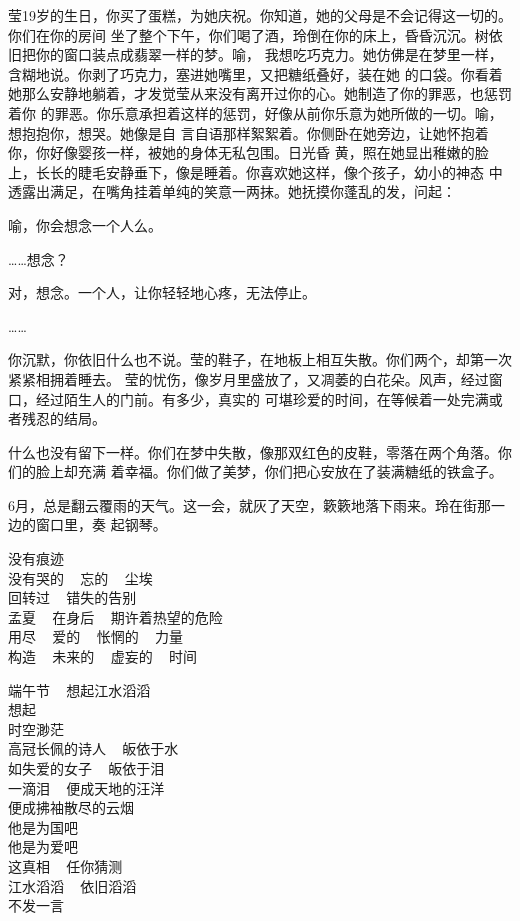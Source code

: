 		莹19岁的生日，你买了蛋糕，为她庆祝。你知道，她的父母是不会记得这一切的。你们在你的房间
	坐了整个下午，你们喝了酒，玲倒在你的床上，昏昏沉沉。树依旧把你的窗口装点成翡翠一样的梦。喻，
	我想吃巧克力。她仿佛是在梦里一样，含糊地说。你剥了巧克力，塞进她嘴里，又把糖纸叠好，装在她
	的口袋。你看着她那么安静地躺着，才发觉莹从来没有离开过你的心。她制造了你的罪恶，也惩罚着你
	的罪恶。你乐意承担着这样的惩罚，好像从前你乐意为她所做的一切。喻，想抱抱你，想哭。她像是自
	言自语那样絮絮着。你侧卧在她旁边，让她怀抱着你，你好像婴孩一样，被她的身体无私包围。日光昏
	黄，照在她显出稚嫩的脸上，长长的睫毛安静垂下，像是睡着。你喜欢她这样，像个孩子，幼小的神态
	中透露出满足，在嘴角挂着单纯的笑意一两抹。她抚摸你蓬乱的发，问起：

		喻，你会想念一个人么。

		……想念？

		对，想念。一个人，让你轻轻地心疼，无法停止。

		……

		你沉默，你依旧什么也不说。莹的鞋子，在地板上相互失散。你们两个，却第一次紧紧相拥着睡去。
	莹的忧伤，像岁月里盛放了，又凋萎的白花朵。风声，经过窗口，经过陌生人的门前。有多少，真实的
	可堪珍爱的时间，在等候着一处完满或者残忍的结局。

		什么也没有留下一样。你们在梦中失散，像那双红色的皮鞋，零落在两个角落。你们的脸上却充满
	着幸福。你们做了美梦，你们把心安放在了装满糖纸的铁盒子。


		6月，总是翻云覆雨的天气。这一会，就灰了天空，簌簌地落下雨来。玲在街那一边的窗口里，奏
	起钢琴。

	\endwriting


	\longpoem{}{}{}

		没有痕迹 \\
		没有哭的 ~ 忘的 ~ 尘埃 \\
		回转过 ~ 错失的告别 \\
		孟夏 ~ 在身后 ~ 期许着热望的危险 \\
		用尽 ~ 爱的 ~ 怅惘的 ~ 力量 \\
		构造 ~ 未来的 ~ 虚妄的 ~ 时间

		端午节 ~ 想起江水滔滔 \\
		想起 \\
		时空渺茫 \\
		高冠长佩的诗人 ~ 皈依于水 \\
		如失爱的女子 ~ 皈依于泪 \\
		一滴泪 ~ 便成天地的汪洋 \\
		便成拂袖散尽的云烟 \\
		他是为国吧 \\
		他是为爱吧 \\
		这真相 ~ 任你猜测 \\
		江水滔滔 ~ 依旧滔滔 \\
		不发一言
	\endlongpoem
	\endwriting


